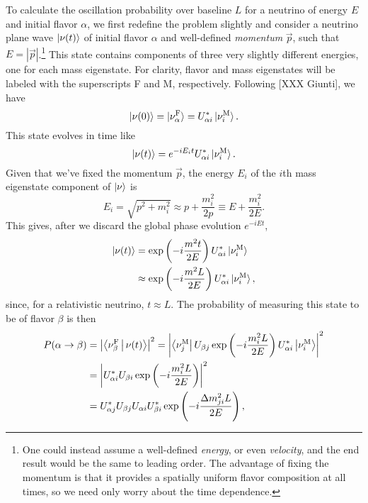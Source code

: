 \documentclass[../thesis.tex]{subfiles}
\begin{document}
\newcommand\nuF{\nu^{\mathrm{F}}} \newcommand\nuM{\nu^{\mathrm{M}}}

To calculate the oscillation probability over baseline $L$ for a neutrino of
energy $E$ and initial flavor $\alpha$, we first redefine the problem slightly
and consider a neutrino plane wave $\ket{\nu(t)}$ of initial flavor $\alpha$ and
well-defined \emph{momentum} $\vec{p}$, such that $E = |\vec{p}|$.\footnote{One
  could instead assume a well-defined \emph{energy}, or even \emph{velocity},
  and the end result would be the same to leading order. The advantage of fixing
  the momentum is that it provides a spatially uniform flavor composition at all
  times, so we need only worry about the time dependence.} This state contains
components of three very slightly different energies, one for each mass
eigenstate. For clarity, flavor and mass eigenstates will be labeled with the
superscripts F and M, respectively. Following [XXX Giunti], we have
\begin{equation*}
\ket{\nu(0)} = \ket{\nuF_\alpha} = U^*_{\alpha i} \ket{\nuM_i}. 
\end{equation*}
This state evolves in time like
\begin{equation*}
\ket{\nu(t)} = e^{-i E_i t} U^*_{\alpha i} \ket{\nuM_i}.
\end{equation*}
Given that we've fixed the momentum $\vec{p}$, the energy $E_i$ of the $i$th
mass eigenstate component of $\ket{\nu}$ is
\begin{equation*}
E_i = \sqrt{p^2 + m_i^2} \approx p + \frac{m_i^2}{2p} \equiv E +
  \frac{m_i^2}{2E}.
\end{equation*}
This gives, after we discard the global phase evolution $e^{-iEt}$,
\begin{align*}
  \ket{\nu(t)} &= \exp\left(-i\frac{m^2t}{2E}\right) U^*_{\alpha i} \ket{\nuM_i} \\
               &\approx \exp\left(-i\frac{m^2L}{2E}\right) U^*_{\alpha i} \ket{\nuM_i},
\end{align*}
since, for a relativistic neutrino, $t \approx L$. The probability of measuring
this state to be of flavor $\beta$ is then
\begin{align*}
  P(\alpha \rightarrow \beta)
  &= \left|\Braket{\nuF_\beta|\nu(t)}\right|^2
    = \left| \Bra{\nuM_j} U_{\beta j} \exp\left( -i\frac{m_i^2L}{2E} \right) U^*_{\alpha i}\Ket{\nuM_i}\right|^2 \\
  &=  \left| U^*_{\alpha i} U_{\beta i} \exp\left( -i \frac{m_i^2L}{2E} \right)\right|^2 \\
  &= U^*_{\alpha j} U_{\beta j} U_{\alpha i} U^*_{\beta i} \exp\left( -i \frac{\Delta m^2_{ji}L}{2E} \right),
\end{align*}
\end{document}
